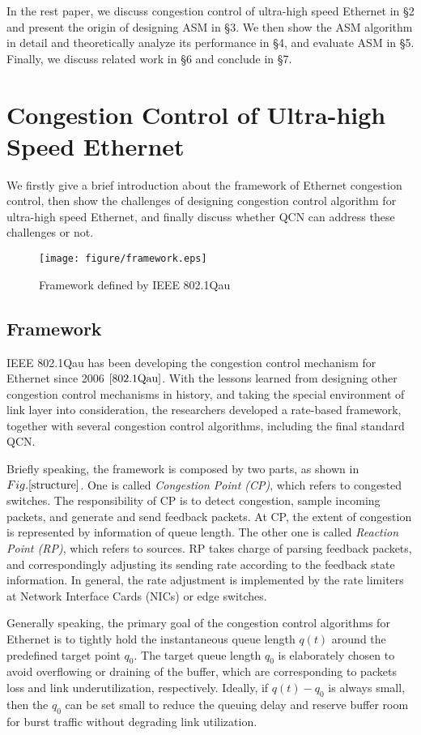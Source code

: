 \documentclass{sig-alternate-10pt}
\def\figurename{Fig.}
\begin{document}
In the rest paper, we discuss congestion control of ultra-high speed Ethernet in \S2 and present the origin of designing ASM in \S3. We then show the ASM algorithm in detail and theoretically analyze its performance in \S4, and evaluate ASM in \S5. Finally, we discuss related work in \S6 and conclude in \S7.




\section{Congestion Control of Ultra-high Speed Ethernet}
We firstly give a brief introduction about the framework of Ethernet congestion control, then show the challenges of designing congestion control algorithm for ultra-high speed Ethernet, and finally discuss whether QCN can address these challenges or not.


\begin{figure}
\centering
\texttt{[image: figure/framework.eps]}
\caption{Framework defined by IEEE 802.1Qau}
\label{structure}
\end{figure}

\subsection{Framework}
IEEE 802.1Qau has been developing the congestion control mechanism for Ethernet since 2006 $\cite{802.1Qau}$. With the lessons learned from designing other congestion control mechanisms in history, and taking the special environment of link layer into consideration, the researchers developed a rate-based framework, together with several congestion control algorithms, including the final standard QCN. 

Briefly speaking, the framework is composed by two parts, as shown in $\figurename{\ref{structure}}$. One is called \textit{Congestion Point (CP)}, which refers to congested switches. The responsibility of CP is to detect congestion, sample incoming packets, and generate and send feedback packets. At CP, the extent of congestion is represented by information of queue length.  The other one is called \textit{Reaction Point (RP)}, which refers to sources. RP takes charge of parsing feedback packets, and correspondingly adjusting its sending rate according to the feedback state information. In general, the rate adjustment is implemented by the rate limiters at Network Interface Cards (NICs) or edge switches.

Generally speaking, the primary goal of the congestion control algorithms for Ethernet is to tightly hold the instantaneous queue length $q(t)$ around the predefined target point $q_0$. The target queue length $q_0$ is elaborately chosen to avoid overflowing or draining of the buffer, which are corresponding to packets loss and link underutilization, respectively. Ideally, if $q(t)-q_0$ is always small, then the $q_0$ can be set small to reduce the queuing delay and reserve buffer room for burst traffic without degrading link utilization.
\end{document}
